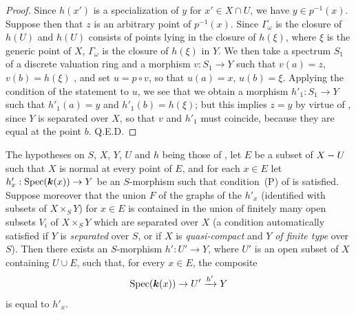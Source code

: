 \begin{proof}
Since $h(x')$ is a specialization of $y$ for $x'\in X\cap U$, we have $y\in p^{-1}(x)$.
Suppose then that $z$ is an arbitrary point of $p^{-1}(x)$.
Since $\Gamma_\omega$ is the closure of $h(U)$ and $h(U)$ consists of points lying in the closure of $h(\xi)$, where $\xi$ is the generic point of $X$, $\Gamma_\omega$ is the closure of $h(\xi)$ in $Y$.
We then take a spectrum $S_1$ of a discrete valuation ring and a morphism $v:S_1\to Y$ such that $v(a)=z$, $v(b)=h(\xi)$ , and set $u=p\circ v$, so that $u(a)=x$, $u(b)=\xi$.
Applying the condition of the statement to $u$, we see that we obtain a morphism $h'_1:S_1\to Y$ such that $h'_1(a)=y$ and $h'_1(b)=h(\xi)$; but this implies $z=y$ by virtue of , since $Y$ is separated over $X$, so that $v$ and $h'_1$ must coincide, because they are equal at the point $b$.
Q.E.D.
\end{proof}

\begin{corollary}[20.4.7]\label{IV.20.4.7}
The hypotheses on $S$, $X$, $Y$, $U$ and $h$ being those of , let $E$ be a subset of $X- U$ such that $X$ is \textup{normal} at every point of $E$, and for each $x\in E$ let $h'_x:\operatorname{Spec}(\boldsymbol{k}(x))\to Y$ be an $S$-morphism such that condition~\textup{(P)} of  is satisfied.
Suppose moreover that the union $F$ of the graphs of the $h'_x$ (identified with subsets of $X\times_S Y$) for $x\in E$ is contained in the union of \textup{finitely} many open subsets $V_i$ of $X\times_S Y$ which are separated over $X$ \textup{(a condition automatically satisfied if $Y$ is \emph{separated} over $S$, or if $X$ is \emph{quasi-compact} and $Y$ \emph{of finite type} over $S$)}.
Then there exists an $S$-morphism $h':U'\to Y$, where $U'$ is an open subset of $X$ containing $U\cup E$, such that, for every $x\in E$, the composite
\[
  \operatorname{Spec}(\boldsymbol{k}(x))\to U'\xrightarrow{h'}Y
\]
is equal to $h'_x$.
\end{corollary}

